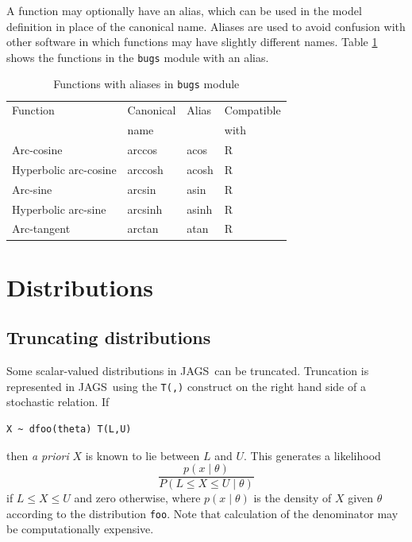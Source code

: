 \documentclass[11pt, a4paper, titlepage]{report}
\newcommand{\JAGS}{\textsf{JAGS}}
\begin{document}
A function may optionally have an alias, which can be used in the
model definition in place of the canonical name. Aliases are used to
avoid confusion with other software in which functions may have
slightly different names. Table \ref{table:bugs:functions:alias} shows
the functions in the \texttt{bugs} module with an alias.

\begin{table}
\begin{center}
\begin{tabular}{llll}
\hline
Function               & Canonical & Alias & Compatible  \\
                       & name      &       & with         \\
\hline
Arc-cosine             & arccos    & acos  & R \\
Hyperbolic arc-cosine  & arccosh   & acosh & R \\
Arc-sine               & arcsin    & asin  & R \\
Hyperbolic arc-sine    & arcsinh   & asinh & R \\
Arc-tangent            & arctan    & atan  & R \\
\hline
\end{tabular}
\caption{Functions with aliases in \texttt{bugs} module
  \label{table:bugs:functions:alias}}
\end{center}
\end{table}

\chapter{Distributions}
\label{chapter:distributions}

\section{Truncating distributions}
\label{section:truncation}

Some scalar-valued distributions in \JAGS\ can be truncated.
Truncation is represented in \JAGS\ using the \texttt{T(,)}
construct on the right hand side of a stochastic relation. If
\begin{verbatim}
X ~ dfoo(theta) T(L,U)
\end{verbatim}
then {\em a priori} $X$ is known to lie between $L$ and $U$. This
generates a likelihood
\[
\frac{p(x \mid \theta)}{P(L \leq X \leq U \mid \theta)}
\]
if $L \leq X \leq U$ and zero otherwise, where $p(x \mid \theta)$ is
the density of $X$ given $\theta$ according to the distribution
\texttt{foo}. Note that calculation of the denominator may be
computationally expensive.
\end{document}
